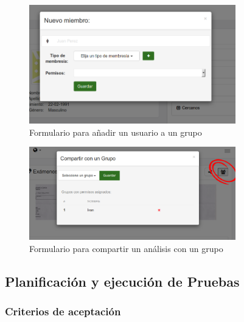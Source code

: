 	    	    \begin{figure}[h]
	    	    	\centering
	    	    	\includegraphics[width=0.8\textwidth]{img/nuevo_usuario_grupo}
	    	    	\caption{Formulario para añadir un usuario a un grupo}
	    	    	\label{nuevo_usuario_grupo}
	    	    \end{figure}	    	    
	    	    
	    	    	    \begin{figure}[h]
	    	    	    	\centering
	    	    	    	\includegraphics[width=0.8\textwidth]{img/compartir_analisis_grupo}
	    	    	    	\caption{Formulario para compartir un análisis con un grupo}
	    	    	    	\label{compartir_analisis_grupo}
	    	    	    \end{figure}	    	    
\clearpage	    	    	    	    
\subsection{Planificación y ejecución de Pruebas}
\subsubsection{Criterios de aceptación}

